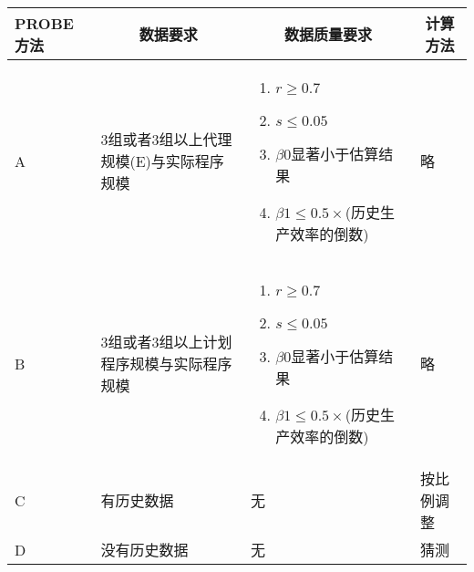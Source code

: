 \vspace{-0.5em}
\begin{spacing}{1.2}
    \centering
    \begin{longtable}{|m{2.3cm}<{\centering}|m{3cm}|m{5.7cm}|m{2.3cm}<{\centering}|}
        \hline
        \textbf{PROBE方法} & \multicolumn{1}{c|}{\textbf{数据要求}} & \multicolumn{1}{c|}{\textbf{数据质量要求}}                                                 & \multicolumn{1}{c|}{\textbf{计算方法}} \\ \hline
        A & 3组或者3组以上代理规模(E)与实际程序规模 &
        \vspace{-1em}
        \begin{enumerate}[label=\arabic*.,leftmargin=1.2em,itemsep=-2pt]
            \item $r\geq 0.7$
            \item $s\leq 0.05$
            \item $\beta 0$显著小于估算结果
            \item $\beta 1 \leq 0.5\times$(历史生产效率的倒数)
        \vspace{-1.3em}
        \end{enumerate}
        & 略 \\ \hline
        B & 3组或者3组以上计划程序规模与实际程序规模 &
        \vspace{-1em}
        \begin{enumerate}[label=\arabic*.,leftmargin=1.2em,itemsep=-2pt]
            \item $r\geq 0.7$
            \item $s\leq 0.05$
            \item $\beta 0$显著小于估算结果
            \item $\beta 1 \leq 0.5\times$(历史生产效率的倒数)
        \vspace{-1.3em}
        \end{enumerate}
        & 略 \\ \hline
        C & 有历史数据 & 无 & 按比例调整 \\ \hline
        D & 没有历史数据 & 无 & 猜测 \\ \hline
    \end{longtable}
	\end{spacing}
\vspace{-1em}